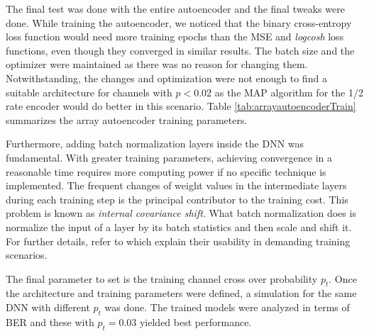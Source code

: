 \documentclass[conference]{IEEEtran}
\begin{document}
The final test was done with the entire autoencoder and the final tweaks were done. While training the autoencoder, we noticed that the binary cross-entropy loss function would need more training epochs than the MSE and \textit{logcosh} loss functions, even though they converged in similar results. The batch size and the optimizer were maintained as there was no reason for changing them. Notwithstanding, the changes and optimization were not enough to find a suitable architecture for channels with $p<0.02$ as the MAP algorithm for the 1/2 rate encoder would do better in this scenario. Table \ref{tab:arrayautoencoderTrain} summarizes the array autoencoder training parameters.

Furthermore, adding batch normalization layers inside the DNN was fundamental. With greater training parameters, achieving convergence in a reasonable time requires more computing power if no specific technique is implemented. The frequent changes of weight values in the intermediate layers during each training step   is the principal contributor to the training cost. This problem is known as \textit{internal covariance shift}. What batch normalization does is normalize the input of a layer by its batch statistics and then scale and shift it. For further details, refer to \cite{DBLP:journals/corr/IoffeS15} which explain their usability in demanding training scenarios.

The final parameter to set is the training channel cross over probability $p_t$. Once the architecture and training parameters were defined, a simulation for the same DNN with different $p_t$ was done. The trained models were analyzed in terms of BER and these with $p_t=0.03$ yielded best performance.
\end{document}
